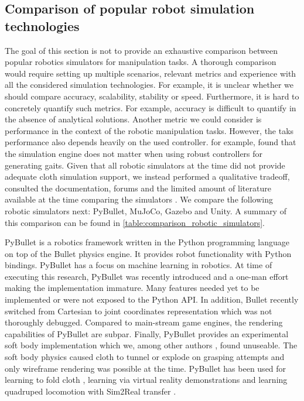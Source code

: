 \documentclass[\home/main.tex]{subfiles}
\begin{document}
\subsection{Comparison of popular robot simulation technologies}
The goal of this section is not to provide an exhaustive comparison between popular robotics simulators for manipulation tasks. A thorough comparison would require setting up multiple scenarios, relevant metrics and experience with all the considered simulation technologies. For example, it is unclear whether we should compare accuracy, scalability, stability or speed. Furthermore, it is hard to concretely quantify such metrics. For example, accuracy is difficult to quantify in the absence of analytical solutions.
Another metric we could consider is performance in the context of the robotic manipulation tasks. However, the taks performance also depends heavily on the used controller. \textcite{Giovanni2011} for example, found that the simulation engine does not matter when using robust controllers for generating gaits. 
Given that all robotic simulators at the time did not provide adequate cloth simulation support, we instead performed a qualitative tradeoff, consulted the documentation, forums and the limited amount of literature available at the time comparing the simulators \autocite{staranowicz2011survey,Erez2015}. We compare the following robotic simulators next: PyBullet, MuJoCo, Gazebo and Unity. A summary of this comparison can be found in \cref{table:comparison_robotic_simulators}.

PyBullet is a robotics framework written in the Python programming language on top of the Bullet physics engine. It provides robot functionality with Python bindings. PyBullet has a focus on machine learning in robotics. At time of executing this research, PyBullet was recently introduced and a one-man effort making the implementation immature. Many features needed yet to be implemented or were not exposed to the Python API. In addition, Bullet recently switched from Cartesian to joint coordinates representation which was not thoroughly debugged. Compared to main-stream game engines, the rendering capabilities of PyBullet are subpar. Finally, PyBullet provides an experimental soft body implementation which we, among other authors \autocite{Matas2018, seita2021learning}, found unuseable. The soft body physics caused cloth to tunnel or explode on grasping attempts and only wireframe rendering was possible at the time. PyBullet has been used for learning to fold cloth \autocite{Matas2018}, learning via virtual reality demonstrations \autocite{mahjourian2019hierarchical} and learning quadruped locomotion with Sim2Real transfer \autocite{tan2018simtoreal}.
\end{document}

